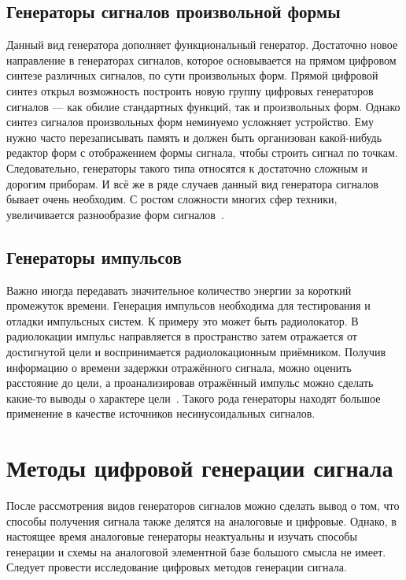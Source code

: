 \subsection{Генераторы сигналов произвольной формы}
	Данный вид генератора дополняет функциональный генератор. Достаточно новое направление в генераторах сигналов, которое основывается на прямом цифровом синтезе различных сигналов, по сути произвольных форм. Прямой цифровой синтез открыл возможность построить новую группу цифровых генераторов сигналов --- как обилие стандартных функций, так и произвольных форм. Однако синтез сигналов произвольных форм неминуемо усложняет устройство. Ему нужно часто перезаписывать память и должен быть организован какой-нибудь редактор форм с отображением формы сигнала, чтобы строить сигнал по точкам. Следовательно, генераторы такого типа относятся к достаточно сложным и дорогим приборам.
	И всё же в ряде случаев данный вид генератора сигналов бывает очень необходим. С ростом сложности многих сфер техники, увеличивается разнообразие форм сигналов~\cite{dgs}.

\subsection{Генераторы импульсов}
	Важно иногда передавать значительное количество энергии за короткий промежуток времени. Генерация импульсов необходима для тестирования и отладки импульсных систем. К примеру это может быть радиолокатор. В радиолокации импульс направляется в пространство затем отражается от достигнутой цели и воспринимается радиолокационным приёмником. Получив информацию о времени задержки отражённого сигнала, можно оценить расстояние до цели, а проанализировав отражённый импульс можно сделать какие-то выводы о характере цели~\cite{dgs}. Такого рода генераторы находят большое применение в качестве источников несинусоидальных сигналов. %


\section{Методы цифровой генерации сигнала}

	После рассмотрения видов генераторов сигналов можно сделать вывод о том, что способы получения сигнала также делятся на аналоговые и цифровые. Однако, в настоящее время аналоговые генераторы неактуальны и изучать способы генерации и схемы на аналоговой элементной базе большого смысла не имеет. Следует провести исследование цифровых методов генерации сигнала. 
